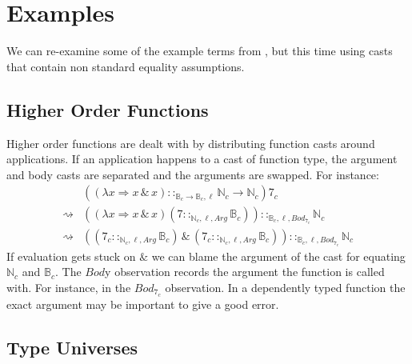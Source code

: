 \section{Examples}
We can re-examine some of the example terms from , but this time using casts that contain non standard equality assumptions.
 
\subsection{Higher Order Functions}
 
Higher order functions are dealt with by distributing function casts around applications.
If an application happens to a cast of function type, the argument and body casts are separated and the arguments are swapped.
For instance:
\begin{align*}
\, & \left(\left(\lambda x\Rightarrow x\,\&\,x\right)::_{\mathbb{B}_c \rightarrow\mathbb{B}_c , \ell}\mathbb{N}_c \rightarrow\mathbb{N}_c \right) 7_c\\
\rightsquigarrow & \left(\left(\lambda x\Rightarrow x\,\&\,x\right)\left(7::_{\mathbb{N}_c , \ell, Arg}\mathbb{B}_c \right)\right)::_{\mathbb{B}_c , \ell, Bod_{7_c}}\mathbb{N}_c \\
\rightsquigarrow & \left(\left(7_c ::_{\mathbb{N}_c , \ell, Arg}\mathbb{B}_c \right)\,\&\,\left(7_c ::_{\mathbb{N}_c , \ell, Arg}\mathbb{B}_c \right)\right) ::_{\mathbb{B}_c , \ell, Bod_{7_c}}\mathbb{N}_c 
\end{align*}
If evaluation gets stuck on $\&$ we can blame the argument of the cast for equating $\mathbb{N}_c$ and $\mathbb{B}_c$.
The $Bod$y observation records the argument the function is called with.
For instance, in the $Bod_{7_c}$ observation.
In a dependently typed function the exact argument may be important to give a good error.

\subsection{Type Universes}
 
